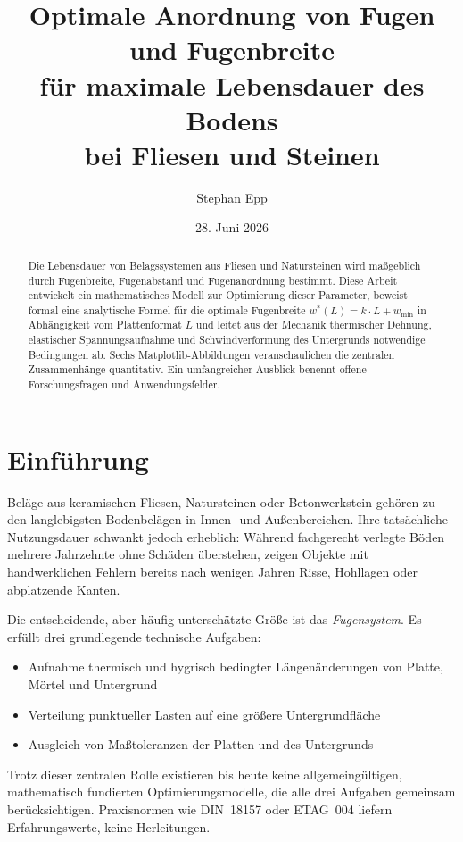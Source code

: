 ﻿\documentclass[a4paper,12pt]{article}
\title{Optimale Anordnung von Fugen und Fugenbreite\\
für maximale Lebensdauer des Bodens\\
bei Fliesen und Steinen}
\author{Stephan Epp}
\date{28. Juni 2026}
\theoremstyle{definition}
\begin{document}
\maketitle

\begin{abstract}
Die Lebensdauer von Belagssystemen aus Fliesen und Natursteinen wird maßgeblich
durch Fugenbreite, Fugenabstand und Fugenanordnung bestimmt. Diese Arbeit
entwickelt ein mathematisches Modell zur Optimierung dieser Parameter,
beweist formal eine analytische Formel für die optimale Fugenbreite
$w^*(L) = k \cdot L + w_{\min}$ in Abhängigkeit vom Plattenformat $L$
und leitet aus der Mechanik thermischer Dehnung,
elastischer Spannungsaufnahme und Schwind\-verformung des Untergrunds
notwendige Bedingungen ab. Sechs Matplotlib-Abbildungen veranschaulichen
die zentralen Zusammenhänge quantitativ. Ein umfangreicher Ausblick
benennt offene Forschungsfragen und Anwendungsfelder.
\end{abstract}

\tableofcontents
\newpage

\section{Einführung}

Beläge aus keramischen Fliesen, Natursteinen oder Betonwerkstein gehören zu den
langlebigsten Bodenbelägen in Innen- und Außenbereichen. Ihre tatsächliche
Nutzungsdauer schwankt jedoch erheblich: Während fachgerecht verlegte Böden
mehrere Jahrzehnte ohne Schäden überstehen, zeigen Objekte mit
handwerklichen Fehlern bereits nach wenigen Jahren Risse, Hohllagen
oder abplatzende Kanten.

Die entscheidende, aber häufig unterschätzte Größe ist das \emph{Fugensystem}.
Es erfüllt drei grundlegende technische Aufgaben:
\begin{itemize}
	\item Aufnahme thermisch und hygrisch bedingter Längenänderungen von
	      Platte, Mörtel und Untergrund
	\item Verteilung punktueller Lasten auf eine größere Untergrundfläche
	\item Ausgleich von Maßtoleranzen der Platten und des Untergrunds
\end{itemize}

Trotz dieser zentralen Rolle existieren bis heute keine allgemeingültigen,
mathematisch fundierten Optimierungsmodelle, die alle drei Aufgaben
gemeinsam berücksichtigen. Praxisnormen wie DIN~18157 \cite{din18157}
oder ETAG~004 \cite{etag004} liefern Erfahrungswerte, keine Herleitungen.
\end{document}
